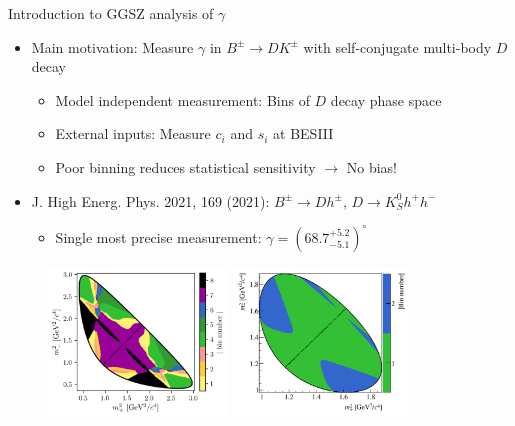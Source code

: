 \documentclass{beamer}
\begin{document}
\begin{frame}{Introduction to GGSZ analysis of $\gamma$}
  \begin{itemize}
    \setlength\itemsep{0.5em}
    \item{Main motivation: Measure $\gamma$ in $B^\pm\to DK^\pm$ with self-conjugate multi-body $D$ decay}
    \begin{itemize}
      \item{Model independent measurement: Bins of $D$ decay phase space}
      \item{External inputs: Measure $c_i$ and $s_i$ at BESIII}
      \item{Poor binning reduces statistical sensitivity $\to$ No bias!}
    \end{itemize}
    \item{J. High Energ. Phys. 2021, 169 (2021): $B^\pm\to Dh^\pm$, $D\to K_S^0 h^+h^-$}
    \begin{itemize}
      \item{Single most precise measurement: $\gamma = (68.7^{+5.2}_{-5.1})^\circ$}
    \end{itemize}
  \end{itemize}
  \begin{figure}
    \includegraphics[height = 4cm]{Plots/KsPiPi_optimal.png}
    \includegraphics[height = 4cm]{Plots/KsKK_binning.png}
  \end{figure}
\end{frame}
\end{document}
